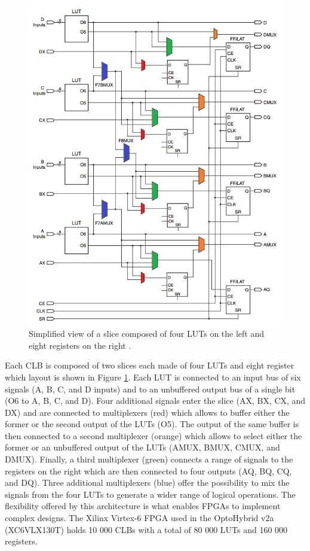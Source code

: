       \begin{figure}[p!]
        \centering
        \includegraphics[width=\textwidth]{img/II-6-irradiation/clb.png}
        \caption{Simplified view of a slice composed of four LUTs on the left and eight registers on the right \cite{VIRTEX-CLB}.}
        \label{fig:II-6-clb}
      \end{figure}

      Each CLB is composed of two slices each made of four LUTs and eight register which layout is shown in Figure \ref{fig:II-6-clb}. Each LUT is connected to an input bus of six signals (A, B, C, and D inputs) and to an unbuffered output bus of a single bit (O6 to A, B, C, and D). Four additional signals enter the slice (AX, BX, CX, and DX) and are connected to multiplexers (red) which allows to buffer either the former or the second output of the LUTs (O5). The output of the same buffer is then connected to a second multiplexer (orange) which allows to select either the former or an unbuffered output of the LUTs (AMUX, BMUX, CMUX, and DMUX). Finally, a third multiplexer (green) connects a range of signals to the registers on the right which are then connected to four outputs (AQ, BQ, CQ, and DQ). Three additional multiplexers (blue) offer the possibility to mix the signals from the four LUTs to generate a wider range of logical operations. The flexibility offered by this architecture is what enables FPGAs to implement complex designs. The Xilinx Virtex-6 FPGA used in the OptoHybrid v2a (XC6VLX130T) holds 10 000 CLBs with a total of 80 000 LUTs and 160 000 registers.

